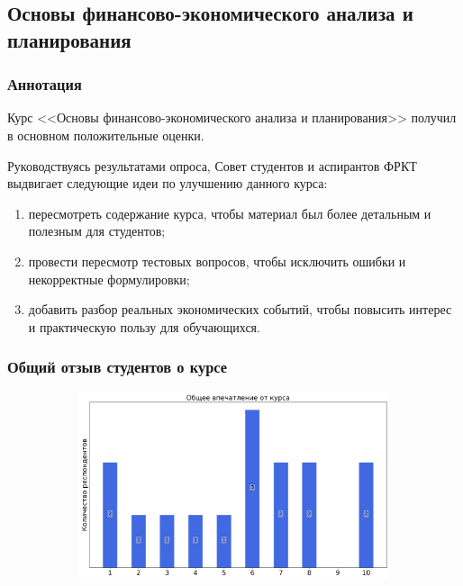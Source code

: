 \subsection{Основы финансово-экономического анализа и планирования}
	
	\subsubsection{Аннотация}

		Курс <<Основы финансово-экономического анализа и планирования>> получил в основном положительные оценки.

		Руководствуясь результатами опроса, Совет студентов и аспирантов ФРКТ выдвигает следующие идеи по улучшению данного курса:
		\begin{enumerate}
			\item пересмотреть содержание курса, чтобы материал был более детальным и полезным для студентов;
			\item провести пересмотр тестовых вопросов, чтобы исключить ошибки и некорректные формулировки;
			\item добавить разбор реальных экономических событий, чтобы повысить интерес и практическую пользу для обучающихся.
		\end{enumerate}


	\subsubsection{Общий отзыв студентов о курсе}

		\begin{figure}[H]
			\centering
			\begin{subfigure}[b]{0.45\textwidth}
				\centering
				\includegraphics[width=\textwidth]{images/4 course/Основы финансово-экономического анализа и планирования/general-0.png}
			\end{subfigure}
		\end{figure}

